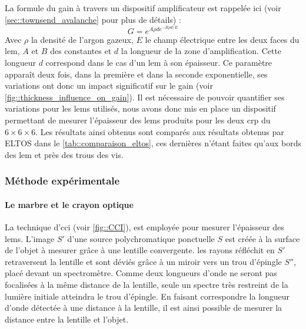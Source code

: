                 La formule du gain à travers un dispositif amplificateur est rappelée ici (voir \autoref{sec::townsend_avalanche} pour plus de détails) :
                \begin{equation}\label{eq::townsend_avalanche_2}
                    G = e^{A\rho d e^{-B\rho d/E}}
                \end{equation}
                Avec $\rho$ la densité de l'argon gazeux, $E$ le champ électrique entre les deux faces du \gls{lem}, $A$ et $B$ des constantes et $d$ la longueur de la zone d'amplification. Cette longueur $d$ correspond dans le cas d'un \gls{lem} à son épaisseur. Ce paramètre apparaît deux fois, dans la première et dans la seconde exponentielle, ses variations ont donc un impact significatif sur le gain (voir \autoref{fig::thickness_influence_on_gain}). Il est nécessaire de pouvoir quantifier ses variations pour les \glspl{lem} utilisés, nous avons donc mis en place un dispositif permettant de mesurer l'épaisseur des \glspl{lem} produits pour les deux \gls{crp} du $6\times6\times6$. Les résultats ainsi obtenus sont comparés aux résultats obtenus par ELTOS dans le \autoref{tab::comparaison_eltos}, ces dernières n'étant faites qu'aux bords des \gls{lem} et près des trous des vis.
                
            \subsubsection{Méthode expérimentale}
                \paragraph{Le marbre et le crayon optique}
                
                    La technique d'\gls{cci} (voir \autoref{fig::CCI}), est employée pour mesurer l'épaisseur des \glspl{lem}. L'image $S'$ d'une source polychromatique ponctuelle $S$ est créée à la surface de l'objet à mesurer grâce à une lentille convergente. les rayons réfléchit en $S'$ retraversent la lentille et sont déviés grâce à un miroir vers un trou d'épingle $S''$, placé devant un spectromètre. Comme deux longueurs d'onde ne seront pas focalisées à la même distance de la lentille, seule un spectre très restreint de la lumière initiale atteindra le trou d'épingle. En faisant correspondre la longueur d'onde détectée à une distance à la lentille, il est ainsi possible de mesurer la distance entre la lentille et l'objet.%
                    
